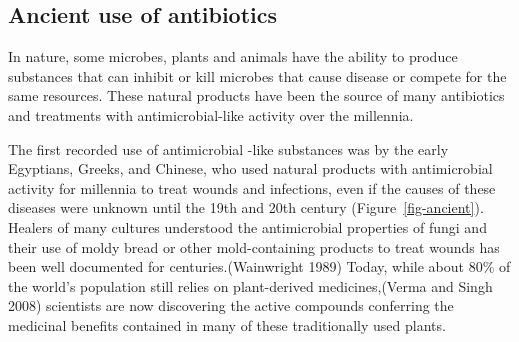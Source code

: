\documentclass[
  letterpaper,
  DIV=11,
  numbers=noendperiod]{scrreprt}
\begin{document}
\hypertarget{ancient-use-of-antibiotics}{%
\subsection{Ancient use of
antibiotics}\label{ancient-use-of-antibiotics}}

In nature, some microbes, plants and animals have the ability to produce
substances that can inhibit or kill microbes that cause disease or
compete for the same resources. These natural products have been the
source of many antibiotics and treatments with antimicrobial-like
activity over the millennia.

The first recorded use of antimicrobial -like substances was by the
early Egyptians, Greeks, and Chinese, who used natural products with
antimicrobial activity for millennia to treat wounds and infections,
even if the causes of these diseases were unknown until the 19th and
20th century (Figure~\ref{fig-ancient}). Healers of many cultures
understood the antimicrobial properties of fungi and their use of moldy
bread or other mold-containing products to treat wounds has been well
documented for centuries.(Wainwright 1989) Today, while about 80\% of
the world's population still relies on plant-derived medicines,(Verma
and Singh 2008) scientists are now discovering the active compounds
conferring the medicinal benefits contained in many of these
traditionally used plants.
\end{document}
